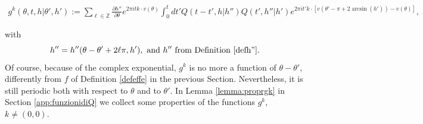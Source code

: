 \documentclass[a4paper,10pt,reqno]{amsart}
\numberwithin{equation}{subsection}
\numberwithin{figure}{subsection}
\begin{document}
{\scriptsize\begin{align*}
 g^k(\theta,t,h|\theta',h'):=\sum_{\ell\in\mathbb{Z}}\frac{\partial h''}{\partial\theta}e^{2\pi itk\cdot v(\theta)}\int_0^tdt' Q(t-t',h|h'') Q(t',h''|h')e^{2\pi it' k\cdot[v(\theta'-\pi+2\arcsin(h'))-v(\theta)]},
 \end{align*}}
 
 with
 \[
 h''=h''(\theta-\theta'+2\ell\pi,h'),\textrm{ and }h''\textrm{ from Definition \ref{defh''}}.
 \]
Of course, because of the complex exponential, $g^k$ is no more a function of  $\theta-\theta'$, differently from $f$ of Definition \ref{defeffe} in the previous Section. Nevertheless, it is still periodic both with respect to $\theta$ and to $\theta'$. In Lemma \ref{lemma:proprgk} in Section \ref{app:funzionidiQ} we collect some properties of the functions $g^k$, $k\neq(0,0)$.
\end{document}
